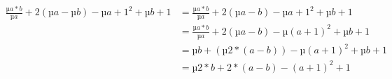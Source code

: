 \begin{align}
\frac{µ{a*b}}{µ{a}}+2(µ{a}-µ{b})-µ{a+1}^2+µ{b+1} & =\frac{µ{a*b}}{µ{a}}+2(µ{a-b})-µ{a+1}^2+µ{b+1}\\
& =\frac{µ{a*b}}{µ{a}}+2(µ{a-b})-µ{(a+1)^2}+µ{b+1}\\
& =µ{b}+(µ{2*(a-b)})-µ{(a+1)^2}+µ{b+1}\\
& =µ{2*b+2*(a-b)-(a+1)^2+1}
\end{align}